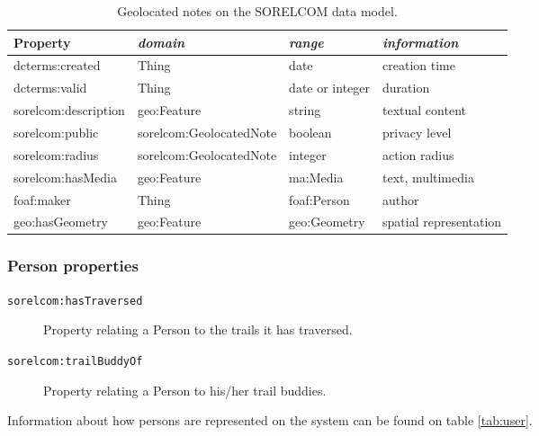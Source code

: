 \begin{table}[ht]
  \centering
  \caption{Geolocated notes on the SORELCOM data model.}\label{tab:note}
  \begin{tabular}{llll}
    \toprule
      \textbf{Property} & \emph{domain}  & \emph{range} & \emph{information}\\
    \midrule
      dcterms:created & Thing & date & creation time \\
      dcterms:valid & Thing & date or integer & duration \\
      sorelcom:description & geo:Feature & string & textual content \\
      sorelcom:public & sorelcom:GeolocatedNote & boolean & privacy level \\
      sorelcom:radius & sorelcom:GeolocatedNote & integer & action radius \\
      sorelcom:hasMedia & geo:Feature & ma:Media & text, multimedia \\
      foaf:maker & Thing & foaf:Person & author \\
      geo:hasGeometry & geo:Feature & geo:Geometry & spatial representation \\
    \bottomrule
  \end{tabular}
\end{table}

\subsubsection*{Person properties}

\begin{description}
\item[\texttt{sorelcom:hasTraversed}] Property relating a Person to the trails it has traversed.
\item[\texttt{sorelcom:trailBuddyOf}] Property relating a Person to his/her trail buddies.
\end{description}

Information about how persons are represented on the system can be found on table \ref{tab:user}.

